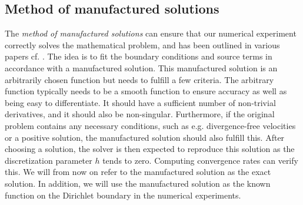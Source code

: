 \subsection{Method of manufactured solutions} 
\label{section:mms}
The \textit{method of manufactured solutions} can ensure that our numerical experiment correctly solves the mathematical problem, and has been outlined in various papers cf. \cite{roache, oberkampf}. The idea is to fit the boundary conditions and source terms in accordance with a manufactured solution. This manufactured solution is an arbitrarily chosen function but needs to fulfill a few criteria. The arbitrary function typically needs to be a smooth function to ensure accuracy as well as being easy to differentiate. It should have a sufficient number of non-trivial derivatives, and it should also be non-singular. Furthermore, if the original problem contains any necessary conditions, such as e.g. divergence-free velocities or a positive solution, the manufactured solution should also fulfill this. After choosing a solution, the solver is then expected to reproduce this solution as the discretization parameter $h$ tends to zero. Computing convergence rates can verify this. We will from now on refer to the manufactured solution as the exact solution. In addition, we will use the manufactured solution as the known function on the Dirichlet boundary in the numerical experiments. 

